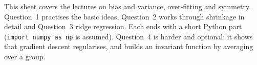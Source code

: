 \documentclass{sotonExamBoxes}    %
\begin{document}

\maketitle

This sheet covers the lectures on bias and variance, over-fitting and
symmetry.  Question~1 practises the basic ideas, Question~2 works through
shrinkage in detail and Question~3 ridge regression.  Each ends with a
short Python part (\texttt{import numpy as np} is assumed).  Question~4
is harder and optional: it shows that gradient descent regularises, and
builds an invariant function by averaging over a group.

\end{document}

